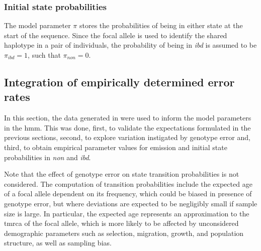 %



%
\subsubsection{Initial state probabilities}
\label{sec:HmmInit}
%

The model parameter $\pi$ stores the probabilities of being in either state at the start of the sequence.
Since the focal allele is used to identify the shared haplotype in a pair of individuals, the probability of being in \emph{ibd} is assumed to be ${\pi_\textit{ibd} = 1}$, such that ${\pi_\textit{non} = 0}$.




%
\subsection{Integration of empirically determined error rates}
\label{sec:HMMError}
%

In this section, the data generated in  were used to inform the model parameters in the \gls{hmm}.
This was done, first, to validate the expectations formulated in the previous sections, second, to explore variation instigated by genotype error and, third, to obtain empirical parameter values for emission and initial state probabilities in \emph{non} and \emph{ibd}.

Note that the effect of genotype error on state transition probabilities is not considered.
The computation of transition probabilities include the expected age of a focal allele dependent on its frequency, which could be biased in presence of genotype error, but where deviations are expected to be negligibly small if sample size is large.
In particular, the expected age represents an approximation to the \gls{tmrca} of the focal allele, which is more likely to be affected by unconsidered demographic parameters such as selection, migration, growth, and population structure, as well as sampling bias.

